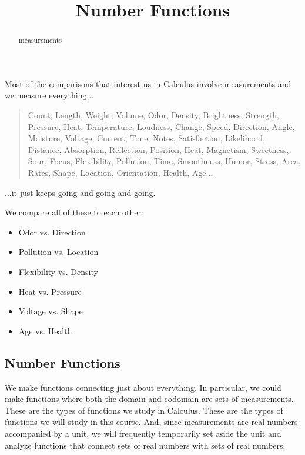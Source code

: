 \documentclass{ximera}
\title{Number Functions}
\begin{document}
\begin{abstract}
measurements
\end{abstract}
\maketitle





Most of the comparisons that interest us in Calculus involve measurements and we measure everything...

\begin{quote}
Count, Length, Weight, Volume, Odor, Density, Brightness, Strength, Pressure, Heat, Temperature, Loudness, Change, Speed, Direction, Angle, Moisture, Voltage, Current, Tone, Notes, Satisfaction, Likelihood, Distance, Absorption, Reflection, Position, Heat, Magnetism, Sweetness, Sour, Focus, Flexibility, Pollution, Time, Smoothness, Humor, Stress, Area, Rates, Shape, Location, Orientation, Health, Age... 
\end{quote}


...it just keeps going and going and going. 


We compare all of these to each other:



\begin{itemize}
\item Odor vs. Direction
\item Pollution vs. Location
\item Flexibility vs. Density
\item Heat vs. Pressure
\item Voltage vs. Shape 
\item Age vs. Health
\end{itemize}







\subsection*{Number Functions}

We make functions connecting just about everything.  In particular, we could make functions where both the domain and codomain are sets of measurements. These are the types of functions we study in Calculus.  These are the types of functions we will study in this course.  And, since measurements are real numbers accompanied by a unit, we will frequently temporarily set aside the unit and analyze functions that connect sets of real numbers with sets of real numbers. 
\end{document}
